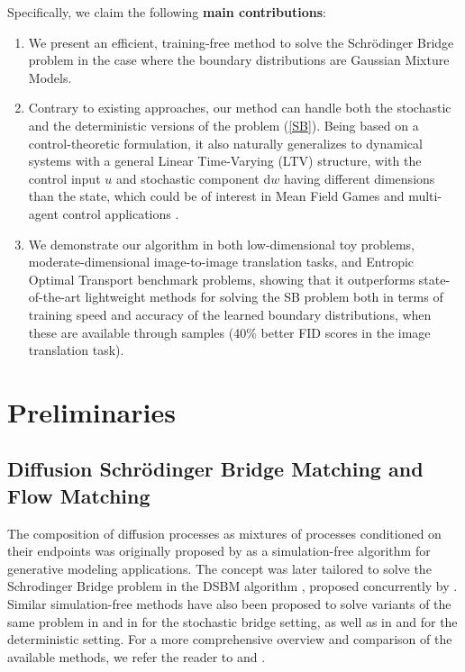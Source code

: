 \documentclass[twoside]{article}
\renewcommand{\eqref}[1]{(\ref{#1})}
\renewcommand{\d}{\mathrm{d}}
\begin{document}
Specifically, we claim the following \textbf{main contributions}: 
\begin{enumerate}
    \item We present an efficient, training-free method to solve the Schr\"{o}dinger Bridge problem in the case where the boundary distributions are Gaussian Mixture Models. 
    
    \item Contrary to existing approaches, our method can handle both the stochastic and the deterministic versions of the problem \eqref{SB}. 
    Being based on a control-theoretic formulation, it also naturally generalizes to dynamical systems with a general Linear Time-Varying (LTV) structure, with the control input $u$ and stochastic component $ \d w$ having different dimensions than the state, which could be of interest in Mean Field Games and multi-agent control applications \citep{ruthotto2020machine, liu2022deep, chen2023density}.
% 
    \item We demonstrate our algorithm in both low-dimensional toy problems, moderate-dimensional image-to-image translation tasks, and Entropic Optimal Transport benchmark problems, showing that it outperforms state-of-the-art lightweight methods for solving the SB problem both in terms of training speed and accuracy of the learned boundary distributions, when these are available through samples (40\% better FID scores in the image translation task). 
\end{enumerate}

\section{Preliminaries}

\subsection{Diffusion Schr\"odinger Bridge Matching and Flow Matching}

The composition of diffusion processes as mixtures of processes conditioned on their endpoints was originally proposed by \cite{peluchetti2021non} as a simulation-free algorithm for generative modeling applications. The concept was later tailored to solve the Schrodinger Bridge problem in the DSBM algorithm \citep{shi2023diffusion}, proposed concurrently by \cite{peluchetti2023diffusion}. Similar simulation-free methods have also been proposed to solve variants of the same problem in \citep{albergo2023building} and in \citep{liu2024generalized} for the stochastic bridge setting, as well as in \cite{liu2022flow} and \cite{lipman2022flow} for the deterministic setting.
For a more comprehensive overview and comparison of the available methods, we refer the reader to \cite[Section 5]{shi2023diffusion} and \citep[Section 5]{peluchetti2023diffusion}.
\end{document}
